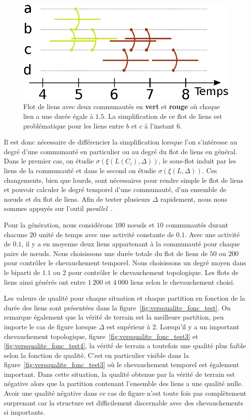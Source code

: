 \begin{figure}
\centering
	\includegraphics[width=0.65\linewidth]{img/Qualite/inter_flot.eps}
\caption{Flot de liens avec deux communautés en \textcolor{olivegreen}{\textbf{vert}} et \textcolor{briquered}{\textbf{rouge}} où chaque lien a une durée égale à $1.5$.
La simplification de ce flot de liens est problématique pour les liens entre $b$ et $c$ à l'instant $6$.}
\label{fig:qualite_simplification}
\end{figure}

Il est donc nécessaire de différencier la simplification lorsque l'on s'intéresse au degré d'une communauté en particulier ou au degré du flot de liens en général.
Dans le premier cas, on étudie $\sigma(\xi(L(C_i),\Delta))$, le sous-flot induit par les liens de la communauté et dans le second on étudie $\sigma(\xi(L,\Delta))$.
Ces changements, bien que lourds, sont nécessaires pour rendre simple le flot de liens et pouvoir calculer le degré temporel d'une communauté, d'un ensemble de n\oe{}uds et du flot de liens.
Afin de tester plusieurs $\Delta$ rapidement, nous nous sommes appuyés sur l'outil \emph{parallel}~\cite{Tange2011a}.


\bigskip
Pour la génération, nous considérons $100$ n\oe{}uds et $10$ communautés durant chacune $20$ unité de temps avec une activité constante de $0.1$.
Avec une activité de $0.1$, il y a en moyenne deux liens appartenant à la communauté pour chaque paire de n\oe{}uds.
Nous choisissons une durée totale du flot de liens de $50$ ou $200$ pour contrôler le chevauchement temporel.
Nous choisissons un degré moyen dans le biparti de $1.1$ ou $2$ pour contrôler le chevauchement topologique.
Les flots de liens ainsi générés ont entre $1\ 200$ et $4\ 000$ liens selon le chevauchement choisi.

Les valeurs de qualité pour chaque situation et chaque partition en fonction de la durée des liens sont présentées dans la figure~\ref{fig:versqualite_fonc_test}.
On remarque également que la vérité de terrain est la meilleure partition, peu importe le cas de figure lorsque $\Delta$ est supérieur à 2.
Lorsqu'il y a un important chevauchement topologique, figure~\ref{fig:versqualite_fonc_test3} et \ref{fig:versqualite_fonc_test4}, la vérité de terrain a toutefois une qualité plus faible selon la fonction de qualité.
C'est en particulier visible dans la figure~\ref{fig:versqualite_fonc_test3} où le chevauchement temporel est également important.
Dans cette situation, la qualité obtenue par la vérité de terrain est négative alors que la partition contenant l'ensemble des liens a une qualité nulle.
Avoir une qualité négative dans ce cas de figure n'est toute fois pas complètement surprenant car la structure est difficilement discernable avec des chevauchements si importants.

